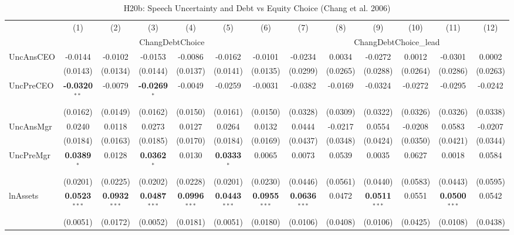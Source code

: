 \begin{landscape}
\begin{table}[H]
\setlength{\tabcolsep}{3pt}
\renewcommand{\arraystretch}{0.85}
\centering
\caption{H20b: Speech Uncertainty and Debt vs Equity Choice (Chang et al. 2006)}
\label{tab:h20b}
\scriptsize
\begin{tabular}{lcccccccccccc}
\toprule
 & (1) & (2) & (3) & (4) & (5) & (6) & (7) & (8) & (9) & (10) & (11) & (12) \\
 & \multicolumn{6}{c}{ChangDebtChoice} & \multicolumn{6}{c}{ChangDebtChoice\_lead} \\
\cmidrule(lr){2-7} \cmidrule(lr){8-13}
\midrule
UncAnsCEO & -0.0144 & -0.0102 & -0.0153 & -0.0086 & -0.0162 & -0.0101 & -0.0234 & 0.0034 & -0.0272 & 0.0012 & -0.0301 & 0.0002 \\
 & (0.0143) & (0.0134) & (0.0144) & (0.0137) & (0.0141) & (0.0135) & (0.0299) & (0.0265) & (0.0288) & (0.0264) & (0.0286) & (0.0263) \\
UncPreCEO & \textbf{-0.0320}$^{**}$ & -0.0079 & \textbf{-0.0269}$^{*}$ & -0.0049 & -0.0259 & -0.0031 & -0.0382 & -0.0169 & -0.0324 & -0.0272 & -0.0295 & -0.0242 \\
 & (0.0162) & (0.0149) & (0.0162) & (0.0150) & (0.0161) & (0.0150) & (0.0328) & (0.0309) & (0.0322) & (0.0326) & (0.0326) & (0.0338) \\
UncAnsMgr & 0.0240 & 0.0118 & 0.0273 & 0.0127 & 0.0264 & 0.0132 & 0.0444 & -0.0217 & 0.0554 & -0.0208 & 0.0583 & -0.0207 \\
 & (0.0184) & (0.0163) & (0.0185) & (0.0170) & (0.0184) & (0.0169) & (0.0437) & (0.0348) & (0.0424) & (0.0350) & (0.0421) & (0.0344) \\
UncPreMgr & \textbf{0.0389}$^{*}$ & 0.0128 & \textbf{0.0362}$^{*}$ & 0.0130 & \textbf{0.0333}$^{*}$ & 0.0065 & 0.0073 & 0.0539 & 0.0035 & 0.0627 & 0.0018 & 0.0584 \\
 & (0.0201) & (0.0225) & (0.0202) & (0.0228) & (0.0201) & (0.0230) & (0.0446) & (0.0561) & (0.0440) & (0.0583) & (0.0443) & (0.0595) \\
\midrule
lnAssets & \textbf{0.0523}$^{***}$ & \textbf{0.0932}$^{***}$ & \textbf{0.0487}$^{***}$ & \textbf{0.0996}$^{***}$ & \textbf{0.0443}$^{***}$ & \textbf{0.0955}$^{***}$ & \textbf{0.0636}$^{***}$ & 0.0472 & \textbf{0.0511}$^{***}$ & 0.0551 & \textbf{0.0500}$^{***}$ & 0.0542 \\
 & (0.0051) & (0.0172) & (0.0052) & (0.0181) & (0.0051) & (0.0180) & (0.0106) & (0.0408) & (0.0106) & (0.0425) & (0.0108) & (0.0438) \\

\end{tabular}
\end{table}
\end{landscape}
